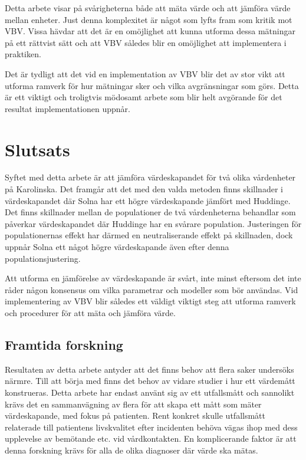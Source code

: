 Detta arbete visar på svårigheterna både att mäta värde och att jämföra värde mellan enheter. Just denna komplexitet är något som lyfts fram som kritik mot VBV. Vissa hävdar att det är en omöjlighet att kunna utforma dessa mätningar på ett rättvist sätt och att VBV således blir en omöjlighet att implementera i praktiken.

Det är tydligt att det vid en implementation av VBV blir det av stor vikt att utforma ramverk för hur mätningar sker och vilka avgränsningar som görs. Detta är ett viktigt och troligtvis mödosamt arbete som blir helt avgörande för det resultat implementationen uppnår.


\section{Slutsats}

Syftet med detta arbete är att jämföra värdeskapandet för två olika vårdenheter på Karolinska. Det framgår att det med den valda metoden finns skillnader i värdeskapandet där Solna har ett högre värdeskapande jämfört med Huddinge. Det finns skillnader mellan de populationer de två vårdenheterna behandlar som påverkar värdeskapandet där Huddinge har en svårare population. Justeringen för populationernas effekt har därmed en neutraliserande effekt på skillnaden, dock uppnår Solna ett något högre värdeskapande även efter denna populationsjustering.

Att utforma en jämförelse av värdeskapande är svårt, inte minst eftersom det inte råder någon konsensus om vilka parametrar och modeller som bör användas. Vid implementering av VBV blir således ett väldigt viktigt steg att utforma ramverk och procedurer för att mäta och jämföra värde. 

\subsection{Framtida forskning}

Resultaten av detta arbete antyder att det finns behov att flera saker undersöks närmre. Till att börja med finns det behov av vidare studier i hur ett värdemått konstrueras. Detta arbete har endast använt sig av ett utfallsmått och sannolikt krävs det en sammanvägning av flera för att skapa ett mått som mäter värdeskapande, med fokus på patienten. Rent konkret skulle utfallsmått relaterade till patientens livskvalitet efter incidenten behöva vägas ihop med dess upplevelse av bemötande etc. vid vårdkontakten. En komplicerande faktor är att denna forskning krävs för alla de olika diagnoser där värde ska mätas.

